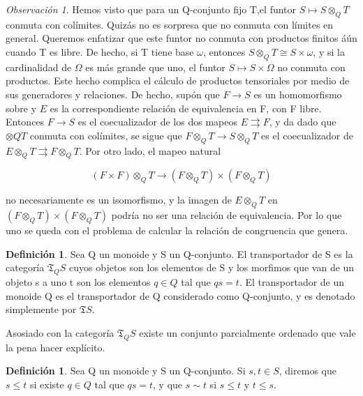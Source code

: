 \documentclass[12pt,spanish]{amsart}
\newcommand{\fk}[1]{\mathfrak{#1}}
\theoremstyle{definition}
\newtheorem{Def}[Theorem]{Definición}
\theoremstyle{remark}
\newtheorem{obs}[Theorem]{Observación}
\begin{document}
\begin{obs}
Hemos visto que para un Q-conjunto fijo T,el funtor $S \mapsto S\otimes_{Q}T$ conmuta con colímites. Quizás no es sorpresa que no conmuta con límites en general. Queremos enfatizar que este funtor no conmuta con productos finitos áún cuando T es libre. De hecho, si T tiene base $\omega$, entonces $S\otimes_{Q}T \cong S\times \omega$, y si la cardinalidad de $\Omega$ es más grande que uno, el funtor $S \mapsto S\times \Omega$ no conmuta con productos. Este hecho complica el cálculo de productos tensoriales por medio de sus generadores y relaciones. De hecho, supón que $F \to S$ es un homomorfismo sobre y $E$ es la correspondiente relación de equivalencia en F, con F libre. Entonces $F \to S$ es el coecualizador de los dos mapeos $E\rightrightarrows F$, y da dado que $\otimes{Q}T$ conmuta con colímites, se sigue que $F\otimes_{Q}T \to S\otimes_{Q}T$ es el coecualizador de $E\otimes_{Q}T \rightrightarrows F\otimes_{Q}T$. Por otro lado, el mapeo natural 

$$(F\times F)\otimes_{Q}T \to (F\otimes_{Q}T)\times (F\otimes_{Q}T)$$

no necesariamente es un isomorfismo, y la imagen de $E\otimes_{Q}T$ en $(F\otimes_{Q}T)\times (F\otimes_{Q}T)$ podría no ser una relación de equivalencia. Por lo que uno se queda con el problema de calcular la relación de congruencia que genera.  
\end{obs}

\begin{Def}
Sea Q un monoide y S un Q-conjunto. El transportador de S es la categoría $\fk{T}_{Q}S$ cuyos objetos son los elementos de S y los morfimos que van de un objeto s a uno t son los elementos $q\in Q$
tal que $qs=t$. El transportador de un monoide Q es el transportador de Q considerado como Q-conjunto, y es denotado simplemente por $\fk{T}S$. 
\end{Def}

Asosiado con la categoría $\fk{T}_{Q}S$ existe un conjunto parcialmente ordenado que vale la pena hacer explícito. \\

\begin{Def}
Sea Q un monoide y S un Q-conjunto. Si $s,t\in S$, diremos que $s\leq t$ si existe $q\in Q$ tal que $qs=t$, y que $s\sim t$ si $s\leq t$ y $t\leq s$. 
\end{Def}
\end{document}
